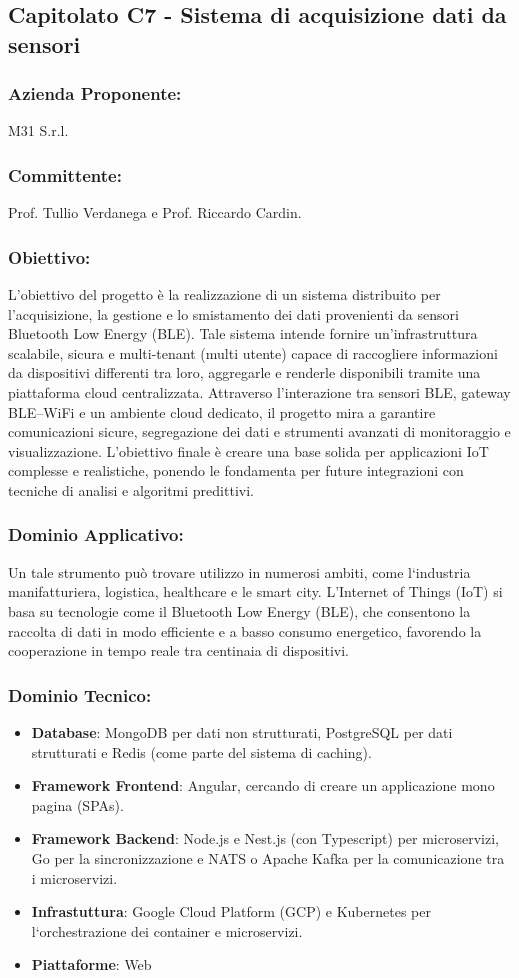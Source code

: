 \documentclass[a4paper,12pt]{article}
\begin{document}
\subsection{Capitolato C7 - Sistema di acquisizione dati da sensori}
\subsubsection*{Azienda Proponente:} M31 S.r.l.
\subsubsection*{Committente:} Prof. Tullio Verdanega e Prof. Riccardo Cardin.
\subsubsection*{Obiettivo:}
L'obiettivo del progetto è la realizzazione di un sistema distribuito per l'acquisizione, la gestione e lo smistamento dei dati provenienti da sensori Bluetooth Low Energy (BLE). Tale sistema intende fornire un'infrastruttura scalabile, sicura e multi-tenant (multi utente) capace di raccogliere informazioni da dispositivi differenti tra loro, aggregarle e renderle disponibili tramite una piattaforma cloud centralizzata.
Attraverso l'interazione tra sensori BLE, gateway BLE–WiFi e un ambiente cloud dedicato, il progetto mira a garantire comunicazioni sicure, segregazione dei dati e strumenti avanzati di monitoraggio e visualizzazione. L'obiettivo finale è creare una base solida per applicazioni IoT complesse e realistiche, ponendo le fondamenta per future integrazioni con tecniche di analisi e algoritmi predittivi.
\subsubsection*{Dominio Applicativo:}
Un tale strumento può trovare utilizzo in numerosi ambiti, come l`industria manifatturiera, logistica, healthcare e le smart city. L'Internet of Things (IoT) si basa su tecnologie come il Bluetooth Low Energy (BLE), che consentono la raccolta di dati in modo efficiente e a basso consumo energetico, favorendo la cooperazione in tempo reale tra centinaia di dispositivi.
\subsubsection*{Dominio Tecnico:}
\begin{itemize}
    \item \textbf{Database}: MongoDB per dati non strutturati, PostgreSQL per dati strutturati e Redis (come parte del sistema di caching).
    \item \textbf{Framework Frontend}: Angular, cercando di creare un applicazione mono pagina (SPAs).
    \item \textbf{Framework Backend}: Node.js e Nest.js (con Typescript) per microservizi, Go per la sincronizzazione e NATS o Apache Kafka per la comunicazione tra i microservizi.
    \item \textbf{Infrastuttura}: Google Cloud Platform (GCP) e Kubernetes per l`orchestrazione dei container e microservizi.
    \item \textbf{Piattaforme}: Web
\end{itemize}
\end{document}
